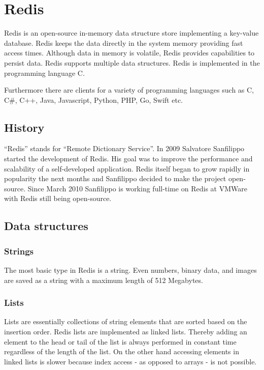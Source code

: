 \section{Redis}

Redis is an open-source in-memory data structure store implementing a key-value
database. Redis keeps the data directly in the system memory providing fast
access times. Although data in memory is volatile, Redis provides capabilities
to persist data. Redis supports multiple data structures. Redis is implemented
in the programming language C\cite{introredis}.

Furthermore there are clients for a variety of programming languages such as C,
C#, C++, Java, Javascript, Python, PHP, Go, Swift etc\cite{clientredis}.

\subsection{History}
``Redis'' stands for ``Remote Dictionary Service''. In 2009 Salvatore Sanfilippo
started the development of Redis. His goal was to improve the performance and
scalability of a self-developed application. Redis itself began to grow rapidly
in popularity the next months and Sanfilippo decided to make the project
open-source. Since March 2010 Sanfilippo is working full-time on Redis at VMWare
with Redis still being open-source\cite{russoredis,wikiredis}.

\subsection{Data structures}
\subsubsection{Strings}
The most basic type in Redis is a string. Even numbers, binary data, and images
are saved as a string with a maximum length of 512 Megabytes.

\subsubsection{Lists}
Lists are essentially collections of string elements that are sorted based on
the insertion order. Redis lists are implemented as linked lists. Thereby adding
an element to the head or tail of the list is always performed in constant time
regardless of the length of the list. On the other hand accessing elements in
linked lists is slower because index access - as opposed to arrays - is not
possible.

